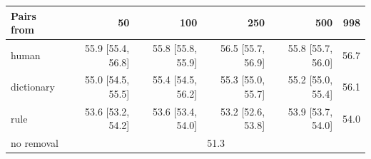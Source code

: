 \begin{tabular}{l rrrrr}
\toprule
Pairs from & 50 & 100 & 250 & 500 & 998 \\
\midrule
human & 55.9 [55.4, 56.8] & 55.8 [55.8, 55.9] & 56.5 [55.7, 56.9] & 55.8 [55.7, 56.0] & 56.7 \\
dictionary & 55.0 [54.5, 55.5] & 55.4 [54.5, 56.2] & 55.3 [55.0, 55.7] & 55.2 [55.0, 55.4] & 56.1 \\
rule & 53.6 [53.2, 54.2] & 53.6 [53.4, 54.0] & 53.2 [52.6, 53.8] & 53.9 [53.7, 54.0] & 54.0 \\
\midrule
no removal & \multicolumn{5}{c}{51.3} \\
\bottomrule
\end{tabular}
